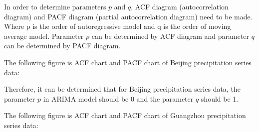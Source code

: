 \documentclass{swmcmthesis}
\begin{document}
In order to determine parameters $p$ and $q$, ACF diagram (autocorrelation diagram) and PACF diagram (partial autocorrelation diagram) need to be made. Where p is the order of autoregressive model and q is the order of moving average model. Parameter $p$ can be determined by ACF diagram and parameter $q$ can be determined by PACF diagram.
\par
The following figure is ACF chart and PACF chart of Beijing precipitation series data:
\begin{figure}[h!t]
    \centering
    \hfill
\end{figure}
\par 
Therefore, it can be determined that for Beijing precipitation series data, the parameter $p$ in ARIMA model should be 0 and the parameter $q$ should be 1.
\par
The following figure is ACF chart and PACF chart of Guangzhou precipitation series data:
\begin{figure}[h!t]
    \centering
    \hfill
\end{figure}
\end{document}

